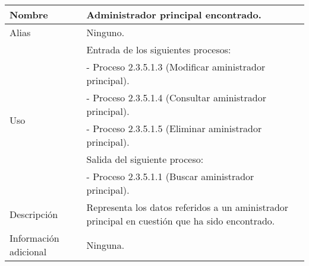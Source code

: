 \begin{center}
  \begin{tabular}{| l | p{9cm} |}
    \hline
    Nombre & \textbf{Administrador principal encontrado}.\\
    \hline
    Alias & Ninguno.\\
    \hline
    \multirow{6}{*}{Uso} & Entrada de los siguientes procesos:\\
                         & - Proceso 2.3.5.1.3 (Modificar aministrador principal).\\
                         & - Proceso 2.3.5.1.4 (Consultar aministrador principal).\\
                         & - Proceso 2.3.5.1.5 (Eliminar aministrador principal).\\
                         & Salida del siguiente proceso:\\
                         & - Proceso 2.3.5.1.1 (Buscar aministrador principal).\\
    \hline
    Descripción & Representa los datos referidos a un aministrador principal
                  en cuestión que ha sido encontrado.\\
    \hline
    Información adicional & Ninguna.\\
    \hline
  \end{tabular}
\end{center}
